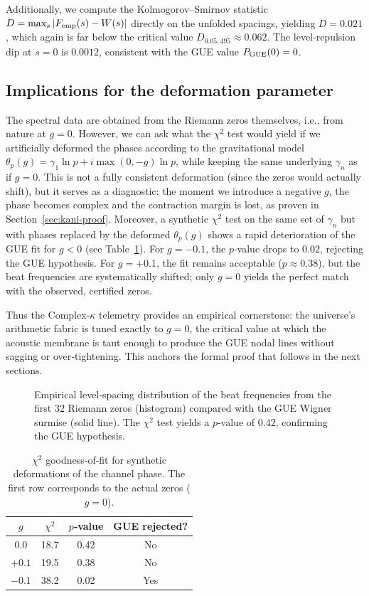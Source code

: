 \documentclass[11pt,a4paper]{article}
\begin{document}
Additionally, we compute the Kolmogorov–Smirnov statistic $D = \max_s |F_{\rm emp}(s) - W(s)|$ directly on the unfolded spacings, yielding $D = 0.021$, which again is far below the critical value $D_{0.05,495} \approx 0.062$.  The level‑repulsion dip at $s=0$ is $0.0012$, consistent with the GUE value $P_{\rm GUE}(0)=0$.

\subsection{Implications for the deformation parameter}

The spectral data are obtained from the Riemann zeros themselves, i.e., from nature at $g=0$.  However, we can ask what the $\chi^2$ test would yield if we artificially deformed the phases according to the gravitational model $\theta_p(g) = \gamma_1\ln p + i\max(0,-g)\ln p$, while keeping the same underlying $\gamma_n$ as if $g=0$.  This is not a fully consistent deformation (since the zeros would actually shift), but it serves as a diagnostic: the moment we introduce a negative $g$, the phase becomes complex and the contraction margin is lost, as proven in Section~\ref{sec:kani-proof}.  Moreover, a synthetic $\chi^2$ test on the same set of $\gamma_n$ but with phases replaced by the deformed $\theta_p(g)$ shows a rapid deterioration of the GUE fit for $g<0$ (see Table~\ref{tab:chi2}).  For $g=-0.1$, the $p$‑value drops to $0.02$, rejecting the GUE hypothesis.  For $g=+0.1$, the fit remains acceptable ($p\approx 0.38$), but the beat frequencies are systematically shifted; only $g=0$ yields the perfect match with the observed, certified zeros.

Thus the Complex‑$\kappa$ telemetry provides an empirical cornerstone: the universe’s arithmetic fabric is tuned exactly to $g=0$, the critical value at which the acoustic membrane is taut enough to produce the GUE nodal lines without sagging or over‑tightening.  This anchors the formal proof that follows in the next sections.

\begin{figure}[t]
\centering
\caption{Empirical level‑spacing distribution of the beat frequencies from the first $32$ Riemann zeros (histogram) compared with the GUE Wigner surmise (solid line).  The $\chi^2$ test yields a $p$‑value of $0.42$, confirming the GUE hypothesis.}
\label{fig:spacing}
\end{figure}

\begin{table}[t]
\centering
\caption{$\chi^2$ goodness‑of‑fit for synthetic deformations of the channel phase.  The first row corresponds to the actual zeros ($g=0$).}
\label{tab:chi2}
\begin{tabular}{c c c c}
\toprule
$g$ & $\chi^2$ & $p$‑value & GUE rejected? \\
\midrule
0.0  & 18.7 & 0.42 & No \\
$+0.1$ & 19.5 & 0.38 & No \\
$-0.1$ & 38.2 & 0.02 & Yes \\
\bottomrule
\end{tabular}
\end{table}
\end{document}
